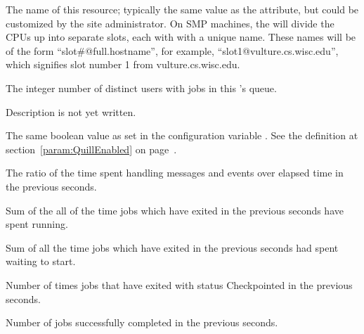 \begin{description}
\item[\AdAttr{Name}:] The name of this resource; typically the same value as
  the  attribute, but could be customized by the site
  administrator.
  On SMP machines, the  will divide the CPUs up into separate
  slots, each with with a unique name.
  These names will be of the form ``slot\#@full.hostname'', for example,
  ``slot1@vulture.cs.wisc.edu'', which signifies slot number 1 from
  vulture.cs.wisc.edu.

\item[\AdAttr{NumUsers}:] The integer number of distinct users with jobs in
  this 's queue.

\item[\AdAttr{PublicNetworkIpAddr}:] Description is not yet written.

\item[\AdAttr{QuillEnabled}:] The same boolean value as set in the
  configuration variable .
  See the definition at section~\ref{param:QuillEnabled} on
  page~\pageref{param:QuillEnabled}.

\item[\AdAttr{RecentDaemonCoreDutyCycle}:] The ratio of the time spent handling messages and events over elapsed time 
  in the previous  seconds.

\item[\AdAttr{RecentJobsAccumRunningTime}:] Sum of the all of the time jobs which have exited
  in the previous  seconds have spent running.

\item[\AdAttr{RecentJobsAccumTimeToStart}:] Sum of all the time jobs which have exited
  in the previous  seconds had spent waiting to start.

\item[\AdAttr{RecentJobsCheckpointed}:] Number of times jobs that have exited with status Checkpointed
  in the previous  seconds.

\item[\AdAttr{RecentJobsCompleted}:] Number of jobs successfully completed
  in the previous  seconds.


\end{description}
